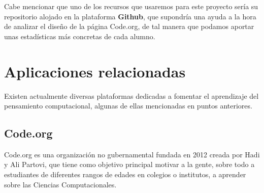 Cabe mencionar que uno de los recursos que usaremos para este proyecto sería su repositorio alojado en la plataforma \textbf{Github}, que supondría una ayuda a la hora de analizar el diseño de la página Code.org, de tal manera que podamos aportar unas estadísticas más concretas de cada alumno.


\section{Aplicaciones relacionadas}
\label{2:sec:2}

Existen actualmente diversas plataformas dedicadas a fomentar el aprendizaje del pensamiento computacional, algunas de ellas mencionadas en puntos anteriores.


\subsection{Code.org}
\label{2:sec:1}

Code.org es una organización no gubernamental fundada en 2012 creada por Hadi y Ali Partovi, que tiene como objetivo principal motivar a la gente, sobre todo a estudiantes de diferentes rangos de edades en colegios o institutos, a aprender sobre las Ciencias Computacionales.